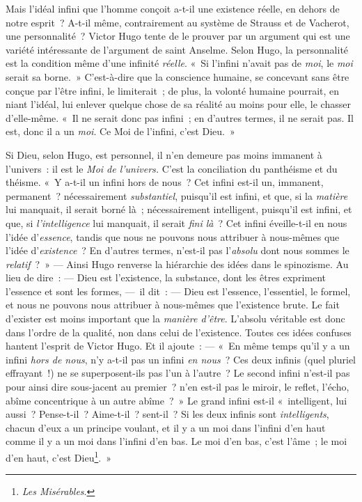 \documentclass[french,twoside]{book} %
\begin{document}
Mais l’idéal infini que l’homme conçoit a-t-il une existence réelle, en dehors de notre esprit ? A-t-il même, contrairement au système de Strauss et de Vacherot, une personnalité ? Victor Hugo tente de le prouver par un argument qui est une variété intéressante de l’argument de saint Anselme. Selon Hugo, la personnalité est la condition même d’une infinité \emph{réelle}. « Si l’infini n’avait pas de \emph{moi}, le \emph{moi} serait sa borne. » C’est-à-dire que la conscience humaine, se concevant sans être conçue par l’être infini, le limiterait ; de plus, la volonté humaine pourrait, en niant l’idéal, lui enlever quelque chose de sa réalité au moins pour elle, le chasser d’elle-même. « Il ne serait donc pas infini ; en d’autres termes, il ne serait pas. Il est, donc il a un \emph{moi}. Ce Moi de l’infini, c’est Dieu. »\par
Si Dieu, selon Hugo, est personnel, il n’en demeure pas moins immanent à l’univers : il est le \emph{Moi de l’univers.} C’est la conciliation du panthéisme et du théisme. « Y a-t-il un infini hors de nous ? Cet infini est-il un, immanent, permanent ? nécessairement \emph{substantiel}, puisqu’il est infini, et que, si la \emph{matière} lui manquait, il serait borné là ; nécessairement intelligent, puisqu’il est infini, et que, si \emph{l’intelligence} lui manquait, il serait \emph{fini là} ? Cet infini éveille-t-il en nous l’idée d’\emph{essence}, tandis que nous ne pouvons nous attribuer à nous-mêmes que l’idée d’\emph{existence} ? En d’autres termes, n’est-il pas l’\emph{absolu} dont nous sommes le \emph{relatif} ? » — Ainsi Hugo renverse la hiérarchie des idées dans le spinozisme. Au lieu de dire : — Dieu est l’existence, la substance, dont les êtres expriment l’essence et sont les formes, — il dit : — Dieu est l’essence, l’essentiel, le formel, et nous ne pouvons nous attribuer à nous-mêmes que l’existence brute. Le fait d’exister est moins important que la \emph{manière d’être}. L’absolu véritable est donc dans l’ordre de la qualité, non dans celui de l’existence. Toutes ces idées confuses hantent l’esprit de Victor Hugo. Et il ajoute : — « En même temps qu’il y a un infini \emph{hors de nous}, n’y a-t-il pas un infini \emph{en nous} ? Ces deux infinis (quel pluriel effrayant !) ne se superposent-ils pas l’un à l’autre ? Le second infini n’est-il pas pour ainsi dire sous-jacent au premier ? n’en est-il pas le miroir, le reflet, l’écho, abîme concentrique à un autre abîme ? » Le grand infini est-il « intelligent, lui aussi ? Pense-t-il ? Aime-t-il ? sent-il ? Si les deux infinis sont \emph{intelligents}, chacun d’eux a un principe voulant, et il y a un moi dans l’infini d’en haut comme il y a un moi dans l’infini d’en bas. Le moi d’en bas, c’est l’âme ; le moi d’en haut, c’est Dieu\footnote{\emph{Les Misérables}.}. »\par
\end{document}
